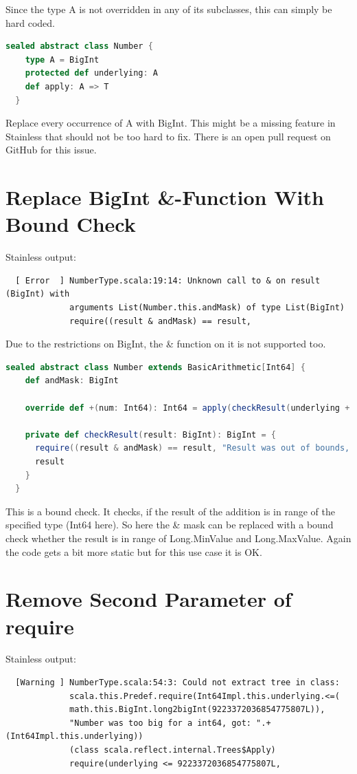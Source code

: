Since the type A is not overridden in any of its subclasses, this can simply be hard coded.
\begin{lstlisting}[language=scala]
  sealed abstract class Number {
    type A = BigInt
    protected def underlying: A
    def apply: A => T
  }
\end{lstlisting}

Replace every occurrence of A with BigInt.
This might be a missing feature in Stainless that should not be too hard to fix.
There is an open pull request  on GitHub for this issue.


\section{Replace BigInt \&-Function With Bound Check}
Stainless output:
{\footnotesize\begin{verbatim}
  [ Error  ] NumberType.scala:19:14: Unknown call to & on result (BigInt) with
             arguments List(Number.this.andMask) of type List(BigInt)
             require((result & andMask) == result,
\end{verbatim}}

Due to the restrictions on BigInt, the \& function on it is not supported too.
\begin{lstlisting}[language=scala]
  sealed abstract class Number extends BasicArithmetic[Int64] {
    def andMask: BigInt

    override def +(num: Int64): Int64 = apply(checkResult(underlying + num.underlying))

    private def checkResult(result: BigInt): BigInt = {
      require((result & andMask) == result, "Result was out of bounds, got: " + result)
      result
    }
  }
\end{lstlisting}

This is a bound check.
It checks, if the result of the addition is in range of the specified type (Int64 here).
So here the \& mask can be replaced with a bound check whether the result is in range of Long.MinValue and Long.MaxValue.
Again the code gets a bit more static but for this use case it is OK.


\section{Remove Second Parameter of require}
Stainless output:
{\footnotesize\begin{verbatim}
  [Warning ] NumberType.scala:54:3: Could not extract tree in class:
             scala.this.Predef.require(Int64Impl.this.underlying.<=(
             math.this.BigInt.long2bigInt(9223372036854775807L)),
             "Number was too big for a int64, got: ".+(Int64Impl.this.underlying))
             (class scala.reflect.internal.Trees$Apply)
             require(underlying <= 9223372036854775807L,
\end{verbatim}}

